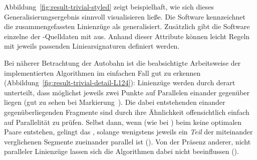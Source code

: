 \documentclass[../main/thesis.tex]{subfiles}
\begin{document}
Abbildung~\ref{fig:result-trivial-styled} zeigt beispielhaft, wie sich dieses Generalisierungsergebnis sinnvoll visualisieren ließe.
Die Software kennzeichnet die zusammengefassten Linienzüge als generalisiert.
Zusätzlich gibt die Software einzelne  der \osm-Quelldaten mit aus.
Anhand dieser Attribute können leicht Regeln mit jeweils passenden Liniearsignaturen definiert werden.


Bei näherer Betrachtung der Autobahn ist die beabsichtigte Arbeitsweise der implementierten Algorithmen im einfachen Fall gut zu erkennen (Abbildung~\ref{fig:result-trivial-detail-L124}):
Linienzüge werden durch  derart unterteilt, dass möglichst jeweils zwei Punkte auf Parallelen einander gegenüber liegen (gut zu sehen bei Markierung~).
Die dabei entstehenden einander gegenüberliegenden Fragmente sind durch ihre Ähnlichkeit offensichtlich einfach auf Parallelität zu prüfen.
Selbst dann, wenn (wie bei ) beim  keine optimalen Paare entstehen, gelingt das , solange wenigstens jeweils ein \emph{Teil} der miteinander verglichenen Segmente zueinander parallel ist ().
Von der Präsenz anderer, nicht paralleler Linienzüge lassen sich die Algorithmen dabei nicht beeinflussen ().
\end{document}
